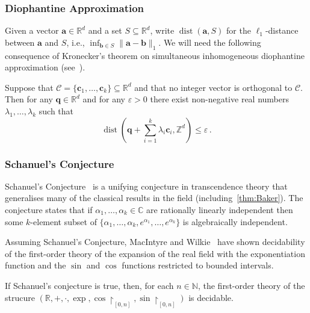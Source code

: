 \documentclass[format=acmsmall, review=false, screen=true]{acmart}
\newcommand{\Reals}{\mathbb{R}}
\newcommand{\Integers}{\mathbb{Z}}
\newcommand{\Naturals}{\mathbb{N}}
\newcommand{\myvector}{\boldsymbol}
\newcommand{\dist}{\operatorname{dist}}
\begin{document}
\subsubsection{Diophantine Approximation}
Given a vector $\myvector{a}\in\Reals^d$ and a set $S\subseteq
\Reals^d$, write $\dist(\myvector{a},S)$ for the $\ell_1$-distance
between $\myvector{a}$ and $S$, i.e., $\inf_{\myvector{b}\in S}
\|\myvector{a}-\myvector{b}\|_1$.  We will need the following
consequence of Kronecker's theorem on simultaneous inhomogeneous
diophantine approximation (see~\cite[Corollary 2.8]{KhachiyanP97}).
\begin{theorem}
\label{thm:kp-density}
Suppose that $\mathcal{C} = \lbrace \myvector{c}_{1}, \ldots, \myvector{c}_{k} \rbrace \subseteq \Reals^{d}$ and that no integer vector is orthogonal to $\mathcal{C}$.
Then for any $\myvector{q} \in \Reals^{d}$
and for any $\varepsilon > 0$ there exist non-negative real numbers $\lambda_{1}, \ldots, \lambda_{k}$ such that
\begin{equation*}
  \dist\left(\myvector{q} + \sum\limits_{i=1}^{k} \lambda_{i} \myvector{c}_{i}, \Integers^{d}\right) \leq \varepsilon \, .
\end{equation*}
\end{theorem}

\subsubsection{Schanuel's Conjecture}
Schanuel's Conjecture~\cite{Lang} is a unifying conjecture in
transcendence theory that generalises many of the classical results in
the field (including~\cref{thm:Baker}).  The conjecture states that if
$\alpha_1,\ldots,\alpha_k \in \mathbb{C}$ are rationally linearly
independent then some $k$-element subset of
$\{\alpha_1,\ldots,\alpha_k,e^{\alpha_1},\ldots,e^{\alpha_k}\}$ is
algebraically independent.

Assuming Schanuel's Conjecture, MacIntyre and Wilkie~\cite{WM} have
shown decidability of the first-order theory of the expansion of the
real field with the exponentiation function and the $\sin$ and $\cos$
functions restricted to bounded intervals.
\begin{theorem}
\label{thm:wilkie-macintyre}
  If Schanuel's conjecture is true, then, for each $n \in \Naturals$,
the first-order theory of the strucure $(\Reals,
+, \cdot, \exp, \cos\restriction_{[0, n]}, \sin\restriction_{[0,n]})$
is decidable.
\end{theorem}
\end{document}
